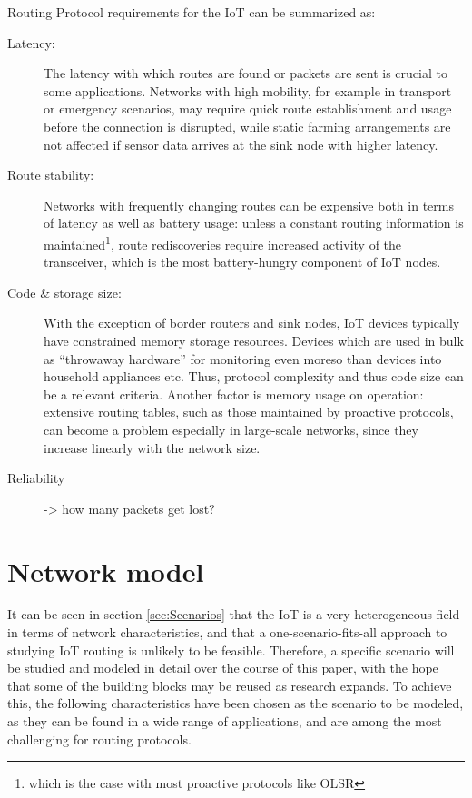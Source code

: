 \documentclass{acm_proc_article-sp}
\begin{document}
Routing Protocol requirements for the IoT can be summarized as:
\begin{description}
\item[Latency:] The latency with which routes are found or packets are sent is crucial to some applications. Networks with high mobility, for example in transport or emergency scenarios, may require quick route establishment and usage before the connection is disrupted, while static farming arrangements are not affected if sensor data arrives at the sink node with higher latency.
\item[Route stability:] Networks with frequently changing routes can be expensive both in terms of latency as well as battery usage: unless a constant routing information is maintained\footnote{which is the case with most proactive protocols like OLSR\cite{RFC-3626}}, route rediscoveries require increased activity of the transceiver, which is the most battery-hungry component of IoT nodes.
\item[Code \& storage size:] With the exception of border routers and sink nodes, IoT devices typically have constrained memory storage resources. Devices which are used in bulk as ``throwaway hardware'' for monitoring even moreso than devices into household appliances etc. Thus, protocol complexity and thus code size can be a relevant criteria. Another factor is memory usage on operation: extensive routing tables, such as those maintained by proactive protocols, can become a problem especially in large-scale networks, since they increase linearly with the network size.
\item[Reliability] -> how many packets get lost?
\end{description}



\section{Network model}
\label{sec:Model}

It can be seen in section \ref{sec:Scenarios} that the IoT is a very heterogeneous field in terms of network characteristics, and that a one-scenario-fits-all approach to studying IoT routing is unlikely to be feasible. Therefore, a specific scenario will be studied and modeled in detail over the course of this paper, with the hope that some of the building blocks may be reused as research expands. To achieve this, the following characteristics have been chosen as the scenario to be modeled, as they can be found in a wide range of applications, and are among the most challenging for routing protocols.
\end{document}
